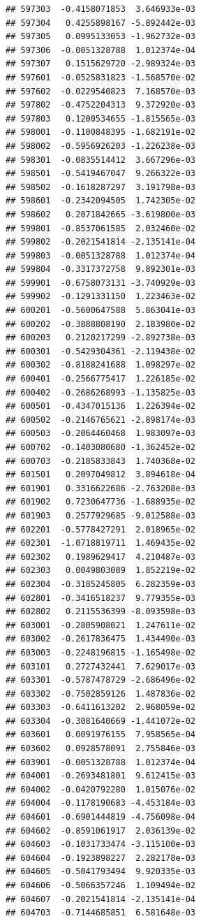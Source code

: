 \begin{frame}[fragile]
\begin{verbatim}
## 597303  -0.4158071853  3.646933e-03
## 597304   0.4255898167 -5.892442e-03
## 597305   0.0995133053 -1.962732e-03
## 597306  -0.0051328788  1.012374e-04
## 597307   0.1515629720 -2.989324e-03
## 597601  -0.0525831823 -1.568570e-02
## 597602  -0.0229540823  7.168570e-03
## 597802  -0.4752204313  9.372920e-03
## 597803   0.1200534655 -1.815565e-03
## 598001  -0.1100848395 -1.682191e-02
## 598002  -0.5956926203 -1.226238e-03
## 598301  -0.0835514412  3.667296e-03
## 598501  -0.5419467047  9.266322e-03
## 598502  -0.1618287297  3.191798e-03
## 598601  -0.2342094505  1.742305e-02
## 598602   0.2071842665 -3.619800e-03
## 599801  -0.8537061585  2.032460e-02
## 599802  -0.2021541814 -2.135141e-04
## 599803  -0.0051328788  1.012374e-04
## 599804  -0.3317372758  9.892301e-03
## 599901  -0.6758073131 -3.740929e-03
## 599902  -0.1291331150  1.223463e-02
## 600201  -0.5600647588  5.863041e-03
## 600202  -0.3888808190  2.183980e-02
## 600203   0.2120217299 -2.892738e-03
## 600301  -0.5429304361 -2.119438e-02
## 600302  -0.8188241688  1.098297e-02
## 600401  -0.2566775417  1.226185e-02
## 600402  -0.2686268993 -1.135825e-03
## 600501  -0.4347015136  1.226394e-02
## 600502  -0.2146765621 -2.898174e-03
## 600503  -0.2064460468  1.983097e-03
## 600702  -0.1403080680 -1.362452e-02
## 600703  -0.2185833843  1.740368e-02
## 601501   0.2097049812  3.894618e-04
## 601901   0.3316622686 -2.763208e-03
## 601902   0.7230647736 -1.688935e-02
## 601903   0.2577929685 -9.012588e-03
## 602201  -0.5778427291  2.018965e-02
## 602301  -1.0718819711  1.469435e-02
## 602302   0.1989629417  4.210487e-03
## 602303   0.0049803089  1.852219e-02
## 602304  -0.3185245805  6.282359e-03
## 602801  -0.3416518237  9.779355e-03
## 602802   0.2115536399 -8.093598e-03
## 603001  -0.2805908021  1.247611e-02
## 603002  -0.2617836475  1.434490e-03
## 603003  -0.2248196815 -1.165498e-02
## 603101   0.2727432441  7.629017e-03
## 603301  -0.5787478729 -2.686496e-02
## 603302  -0.7502859126  1.487836e-02
## 603303  -0.6411613202  2.968059e-02
## 603304  -0.3081640669 -1.441072e-02
## 603601   0.0091976155  7.958565e-04
## 603602   0.0928578091  2.755846e-03
## 603901  -0.0051328788  1.012374e-04
## 604001  -0.2693481801  9.612415e-03
## 604002  -0.0420792280  1.015076e-02
## 604004  -0.1178190683 -4.453184e-03
## 604601  -0.6901444819 -4.756098e-04
## 604602  -0.8591061917  2.036139e-02
## 604603  -0.1031733474 -3.115100e-03
## 604604  -0.1923898227  2.282178e-03
## 604605  -0.5041793494  9.920335e-03
## 604606  -0.5066357246  1.109494e-02
## 604607  -0.2021541814 -2.135141e-04
## 604703  -0.7144685851  6.581648e-03

\end{verbatim}
\end{frame}

